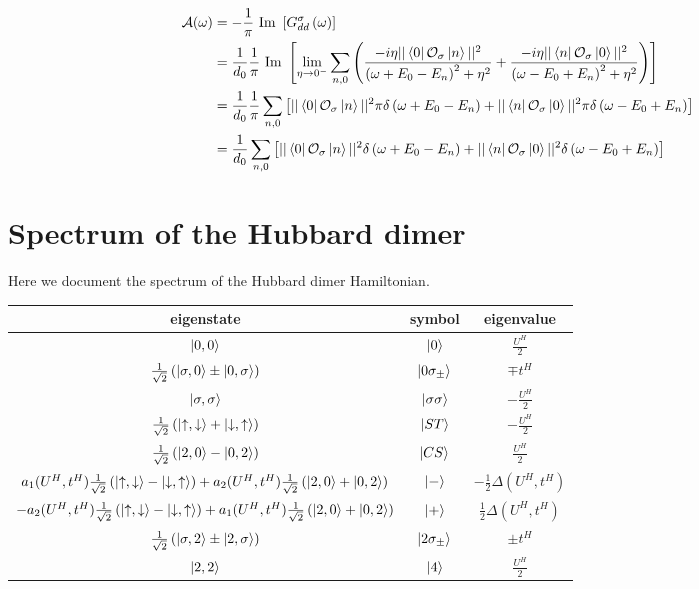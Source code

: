 \documentclass[prb]{revtex4-2}
\begin{document}
\begin{equation}\begin{aligned}
	\mathcal{A(\omega)} &= -\frac{1}{\pi}\text{ Im }\left[G_{dd}^\sigma\left( \omega \right) \right] \\
			    &= \frac{1}{d_0}\frac{1}{\pi}\text{ Im }\left[\lim_{\eta \to 0^-}\sum_{n,0}\left(\frac{-i\eta ||\bra{0}\mathcal{O}_{\sigma}\ket{n}||^2}{\left(\omega + E_0 - E_n\right)^2 + \eta^2} + \frac{-i\eta ||\bra{n}\mathcal{O}_{\sigma}\ket{0}||^2}{\left(\omega - E_0 + E_n\right)^2 + \eta^2}\right)\right]\\
			    &= \frac{1}{d_0}\frac{1}{\pi}\sum_{n,0}\left[||\bra{0}\mathcal{O}_{\sigma}\ket{n}||^2\pi\delta\left(\omega + E_0 - E_n\right) + ||\bra{n}\mathcal{O}_{\sigma}\ket{0}||^2\pi\delta\left(\omega - E_0 + E_n\right)\right]\\
			    &= \frac{1}{d_0}\sum_{n,0}\left[||\bra{0}\mathcal{O}_{\sigma}\ket{n}||^2\delta\left(\omega + E_0 - E_n\right) + ||\bra{n}\mathcal{O}_{\sigma}\ket{0}||^2\delta\left(\omega - E_0 + E_n\right)\right]\\
\end{aligned}\end{equation}

\section{Spectrum of the Hubbard dimer}
Here we document the spectrum of the Hubbard dimer Hamiltonian.
\begin{center}
	\begin{tabular}{|c|c|c|}
	\hline
	eigenstate & symbol & eigenvalue \\
	\hline
	$\ket{0,0}$ & $\ket{0}$ & \( \frac{U^H}{2}\)\\
	$ \frac{1}{\sqrt 2}\left(\ket{\sigma,0} \pm \ket{0,\sigma}\right)$ & $\ket{0\sigma_\pm}$ & \(\mp t^H\)\\
	$\ket{\sigma,\sigma}$ & $\ket{\sigma\sigma}$ & \( -\frac{U^H}{2}\)\\
	$ \frac{1}{\sqrt 2}\left(\ket{\uparrow,\downarrow} + \ket{\downarrow,\uparrow}\right)$ & $\ket{ST}$ & \( -\frac{U^H}{2}\)\\
	$ \frac{1}{\sqrt 2}\left(\ket{2,0} - \ket{0,2}\right)$ & $\ket{CS}$ & \( \frac{U^H}{2}\)\\
	$a_1(U^H, t^H) \frac{1}{\sqrt 2}\left(\ket{\uparrow,\downarrow} - \ket{\downarrow,\uparrow}\right) + a_2(U^H, t^H)\frac{1}{\sqrt 2}\left(\ket{2,0} + \ket{0,2}\right)$ & $\ket{-}$ & \(-\frac{1}{2}\Delta(U^H, t^H)\)\\
	$-a_2(U^H, t^H) \frac{1}{\sqrt 2}\left(\ket{\uparrow,\downarrow} - \ket{\downarrow,\uparrow}\right) + a_1(U^H, t^H)\frac{1}{\sqrt 2}\left(\ket{2,0} + \ket{0,2}\right)$ & $\ket{+}$ & \(\frac{1}{2}\Delta(U^H, t^H)\)\\
	$ \frac{1}{\sqrt 2}\left(\ket{\sigma,2} \pm \ket{2,\sigma}\right)$ & $\ket{2\sigma_\pm}$ & \(\pm t^H\)\\
	$\ket{2,2}$ & $\ket{4}$ & \( \frac{U^H}{2}\)\\
\hline
	\end{tabular}
	\label{hubb_dim_spectrum}
\end{center}
\end{document}
